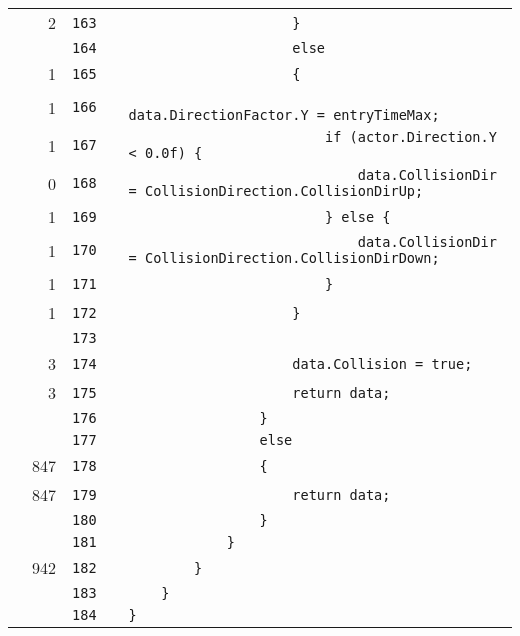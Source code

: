 \documentclass[a4paper,landscape,10pt]{article}
\begin{document}
\begin{longtable}[l]{lrrll}
\cellcolor{green} & 2 & \verb~163~ & & \verb~                    }~\\
\cellcolor{gray} &  & \verb~164~ & & \verb~                    else~\\
\cellcolor{green} & 1 & \verb~165~ & & \verb~                    {~\\
\cellcolor{green} & 1 & \verb~166~ & & \verb~                        data.DirectionFactor.Y = entryTimeMax;~\\
\cellcolor{orange} & 1 & \verb~167~ & & \verb~                        if (actor.Direction.Y < 0.0f) {~\\
\cellcolor{red} & 0 & \verb~168~ & & \verb~                            data.CollisionDir = CollisionDirection.CollisionDirUp;~\\
\cellcolor{green} & 1 & \verb~169~ & & \verb~                        } else {~\\
\cellcolor{green} & 1 & \verb~170~ & & \verb~                            data.CollisionDir = CollisionDirection.CollisionDirDown;~\\
\cellcolor{green} & 1 & \verb~171~ & & \verb~                        }~\\
\cellcolor{green} & 1 & \verb~172~ & & \verb~                    }~\\
\cellcolor{gray} &  & \verb~173~ & & \verb~~\\
\cellcolor{green} & 3 & \verb~174~ & & \verb~                    data.Collision = true;~\\
\cellcolor{green} & 3 & \verb~175~ & & \verb~                    return data;~\\
\cellcolor{gray} &  & \verb~176~ & & \verb~                }~\\
\cellcolor{gray} &  & \verb~177~ & & \verb~                else~\\
\cellcolor{green} & 847 & \verb~178~ & & \verb~                {~\\
\cellcolor{green} & 847 & \verb~179~ & & \verb~                    return data;~\\
\cellcolor{gray} &  & \verb~180~ & & \verb~                }~\\
\cellcolor{gray} &  & \verb~181~ & & \verb~            }~\\
\cellcolor{green} & 942 & \verb~182~ & & \verb~        }~\\
\cellcolor{gray} &  & \verb~183~ & & \verb~    }~\\
\cellcolor{gray} &  & \verb~184~ & & \verb~}~\\
\end{longtable}
\newpage
\end{document}
